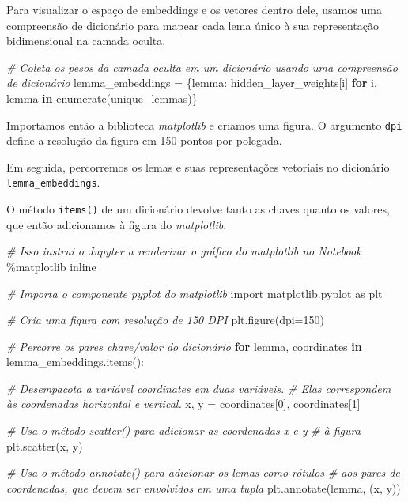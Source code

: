 \documentclass[
  brazilian,
]{article}
\newenvironment{Shaded}{}{}
\newcommand{\BuiltInTok}[1]{#1}
\newcommand{\CommentTok}[1]{\textcolor[rgb]{0.38,0.63,0.69}{\textit{#1}}}
\newcommand{\ControlFlowTok}[1]{\textcolor[rgb]{0.00,0.44,0.13}{\textbf{#1}}}
\newcommand{\DecValTok}[1]{\textcolor[rgb]{0.25,0.63,0.44}{#1}}
\newcommand{\ImportTok}[1]{#1}
\newcommand{\KeywordTok}[1]{\textcolor[rgb]{0.00,0.44,0.13}{\textbf{#1}}}
\newcommand{\NormalTok}[1]{#1}
\newcommand{\OperatorTok}[1]{\textcolor[rgb]{0.40,0.40,0.40}{#1}}
\begin{document}
Para visualizar o espaço de embeddings e os vetores dentro dele, usamos
uma compreensão de dicionário para mapear cada lema único à sua
representação bidimensional na camada oculta.

\begin{Shaded}
\begin{Highlighting}[]
\CommentTok{\# Coleta os pesos da camada oculta em um dicionário usando uma compreensão de dicionário}
\NormalTok{lemma\_embeddings }\OperatorTok{=}\NormalTok{ \{lemma: hidden\_layer\_weights[i] }\ControlFlowTok{for}\NormalTok{ i, lemma }\KeywordTok{in} \BuiltInTok{enumerate}\NormalTok{(unique\_lemmas)\}}
\end{Highlighting}
\end{Shaded}

Importamos então a biblioteca \emph{matplotlib} e criamos uma figura. O
argumento \texttt{dpi} define a resolução da figura em 150 pontos por
polegada.

Em seguida, percorremos os lemas e suas representações vetoriais no
dicionário \texttt{lemma\_embeddings}.

O método \texttt{items()} de um dicionário devolve tanto as chaves
quanto os valores, que então adicionamos à figura do \emph{matplotlib}.

\begin{Shaded}
\begin{Highlighting}[]
\CommentTok{\# Isso instrui o Jupyter a renderizar o gráfico do matplotlib no Notebook}
\OperatorTok{\%}\NormalTok{matplotlib inline}

\CommentTok{\# Importa o componente pyplot do matplotlib}
\ImportTok{import}\NormalTok{ matplotlib.pyplot }\ImportTok{as}\NormalTok{ plt}

\CommentTok{\# Cria uma figura com resolução de 150 DPI}
\NormalTok{plt.figure(dpi}\OperatorTok{=}\DecValTok{150}\NormalTok{)}

\CommentTok{\# Percorre os pares chave/valor do dicionário}
\ControlFlowTok{for}\NormalTok{ lemma, coordinates }\KeywordTok{in}\NormalTok{ lemma\_embeddings.items():}

    \CommentTok{\# Desempacota a variável coordinates em duas variáveis.}
    \CommentTok{\# Elas correspondem às coordenadas horizontal e vertical.}
\NormalTok{    x, y }\OperatorTok{=}\NormalTok{ coordinates[}\DecValTok{0}\NormalTok{], coordinates[}\DecValTok{1}\NormalTok{]}

    \CommentTok{\# Usa o método scatter() para adicionar as coordenadas x e y}
    \CommentTok{\# à figura}
\NormalTok{    plt.scatter(x, y)}

    \CommentTok{\# Usa o método annotate() para adicionar os lemas como rótulos}
    \CommentTok{\# aos pares de coordenadas, que devem ser envolvidos em uma tupla}
\NormalTok{    plt.annotate(lemma, (x, y))}
\end{Highlighting}
\end{Shaded}
\end{document}
